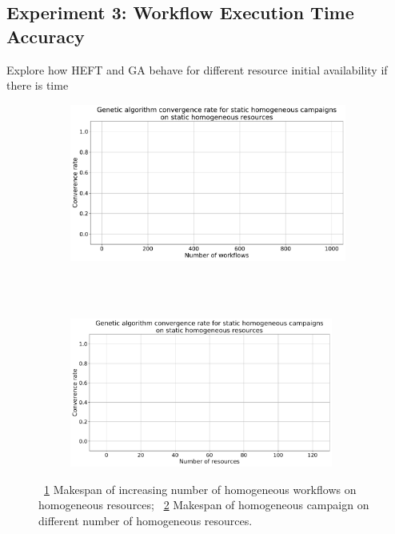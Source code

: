 \subsection{Experiment 3: Workflow Execution Time Accuracy}

Explore how HEFT and GA behave for different resource initial availability if there is time
\begin{figure}[ht!]
    \centering
    \begin{subfigure}[b]{0.85\textwidth}
        \includegraphics[width=.95\textwidth]{figures/campaign/StHomoCampaigns_4VarHomoResources.pdf}
        \caption{}
        \label{fig:StHomoCampaigns_4VarHomoResources}
    \end{subfigure}\\
    ~ 
    \begin{subfigure}[b]{0.85\textwidth}
        \includegraphics[width=0.95\textwidth]{figures/campaign/VarHomoResources_StHomoCampaigns.pdf}
        \caption{}
        \label{fig:VarHomoResources_StHomoCampaigns}
    \end{subfigure}
    \caption{~\ref{fig:StHomoCampaigns_4VarHomoResources} Makespan of increasing number of homogeneous workflows on homogeneous resources;
    ~\ref{fig:VarHomoResources_StHomoCampaigns} Makespan of homogeneous campaign on different number of homogeneous resources.}
    \label{fig:resource_avail}
\end{figure}

